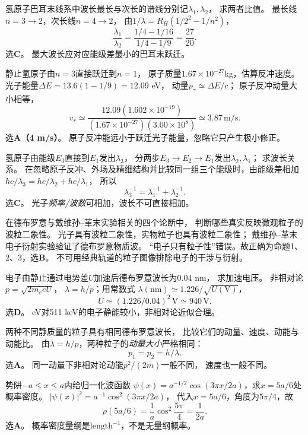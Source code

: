 \problemtext 氢原子巴耳末线系中波长最长与次长的谱线分别记$\lambda_1,\lambda_2$，
求两者比值。
\workings
最长线$n=3\to2$，次长线$n=4\to2$，
由$1/\lambda=R_H(1/2^2-1/n^2)$，
\[
\boxed{\frac{\lambda_1}{\lambda_2}
=\frac{1/4-1/16}{1/4-1/9}=\frac{27}{20}}.
\]
选\textbf{C}。
\crosscheck 最大波长应对应能级差最小的巴耳末跃迁。

\problemtext 静止氢原子由$n=3$直接跃迁到$n=1$，
原子质量$1.67\times10^{-27}$kg，估算反冲速度。
\workings
光子能量$\Delta E=13.6(1-1/9)=12.09$ eV，
动量$p_\gamma\simeq\Delta E/c$；
原子反冲动量大小相等，
\[
\boxed{v_r\simeq\frac{12.09(1.602\times10^{-19})}
{(1.67\times10^{-27})(3.00\times10^8)}
\simeq3.87\,\mathrm{m/s}}.
\]
选\textbf{A（4 m/s）}。
\crosscheck 原子反冲能远小于跃迁光子能量，忽略它只产生极小修正。

\problemtext 氢原子由能级$E_3$直接到$E_1$发出$\lambda_3$，
分两步$E_3\to E_2\to E_1$发出$\lambda_2,\lambda_1$；
求波长关系。
\workings
在忽略原子反冲、外场及精细结构并比较同一组三个能级时，由能级差相加
$hc/\lambda_3=hc/\lambda_2+hc/\lambda_1$，
所以
\[
\boxed{\lambda_3^{-1}=\lambda_1^{-1}+\lambda_2^{-1}}.
\]
选\textbf{C}。
\crosscheck 光子\emph{频率/波数}可相加，波长不可直接相加。

\problemtext 在德布罗意与戴维孙--革末实验相关的四个论断中，
判断哪些真实反映微观粒子的波粒二象性。
\workings
光子具有波粒二象性，实物粒子也具有波粒二象性；
戴维孙--革末电子衍射实验验证了德布罗意物质波。
“电子只有粒子性”错误。故正确为命题1、2、3，选\textbf{B}。
\crosscheck 不可用经典轨道的粒子图像排除电子的干涉与衍射。

\problemtext 电子由静止通过电势差$U$加速后德布罗意波长为$0.04$ nm，
求加速电压。
\workings
非相对论$p=\sqrt{2m_e eU}$，
$\lambda=h/p$；用常数式
$\lambda(\mathrm{nm})\simeq1.226/\sqrt{U(\mathrm V)}$，
\[
\boxed{U\simeq(1.226/0.04)^2\,\mathrm V
\simeq940\,\mathrm V}.
\]
选\textbf{D}。
 eV对511 keV的电子静能较小，非相对论近似合理。

\problemtext 两种不同静质量的粒子具有相同德布罗意波长，
比较它们的动量、速度、动能与动能比。
\workings
由$\lambda=h/p$，两种粒子的\emph{动量大小}严格相同：
\[
\boxed{p_1=p_2=h/\lambda}.
\]
选\textbf{A}。
\crosscheck 同一动量下非相对论动能$p^2/(2m)$一般不同，
速度也一般不同。

\problemtext 势阱$-a\le x\le a$内给归一化波函数
$\psi(x)=a^{-1/2}\cos(3\pi x/2a)$，求$x=5a/6$处概率密度。
\workings
$|\psi(x)|^2=a^{-1}\cos^2(3\pi x/2a)$，
代入$x=5a/6$，角度为$5\pi/4$，故
\[
\boxed{\rho(5a/6)=\frac1a\cos^2\frac{5\pi}{4}=\frac1{2a}}.
\]
选\textbf{A}。
\crosscheck 概率密度量纲是$\mathrm{length}^{-1}$，不是无量纲概率。

